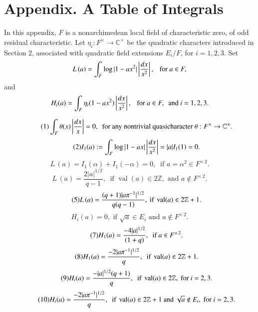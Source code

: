 \documentclass{amsart}
\newcommand\C{{\mathbb C}}
\newcommand\leftd[1]{\left | {d#1\over #1^2}\right |}
\newcommand\leftdx{\leftd x}
\newcommand\LOG{{L\,}}
\newcommand\val{\operatorname{val}}
\begin{document}
\section{Appendix. A Table of Integrals}


In this appendix, $F$ is a nonarchimedean 
local field of characteristic zero,
of odd residual characteristic.  Let $\eta_i:F^\times\to \C^\times$
be the quadratic characters introduced in Section 2, associated with
quadratic field extensions $E_i/F$, for $i=1,2,3$.
Set
$$\LOG(a) = \int_F \log|1-a x^2| \leftdx,\ \ \text{ for } a\in F,$$
and
$$H_i(a) = \int_F \eta_i(1-a x^2) \leftdx,\ \ \text{ for } a\in F,
\text{ \ and } i=1,2,3.$$

\bigskip


\begin{equation}\tag{1}
\int_F\theta(x)\left|{dx\over x}\right| = 0, \ 
\text{\  for any nontrivial quasicharacter\  }
 \theta: F^\times\to \C^\times. 
\end{equation}
%
\begin{equation}\tag{2}
I_1(a):= \int_F \log|1-a x| \leftdx = |a|I_1(1) = 0.
\end{equation}
%
\begin{equation}\tag{3}
\LOG(a) = I_1(\alpha) + I_1(-\alpha) =0,\ \text{ if } a=\alpha^2\in F^{\times\,2}.
\end{equation}
%
\begin{equation}\tag{4}
\LOG(a) = \frac{2|a|^{1/2}} {q-1}, \ \text{ if } \val(a) \in 2{\mathbb Z},
		\text{ and } a\not\in F^{\times\,2}.
\end{equation}
%
%
\begin{equation}\tag{5}
\LOG(a) = {(q+1)|a\pi^{-1}|^{1/2}\over q(q-1)}, \text{ if }
		\val(a) \in 2{\mathbb Z}+1.
\end{equation}
%
%
\begin{equation}\tag{6}
H_i(a) = 0, \text{ if } \sqrt{a} \in E_i \text{ and } a\not\in 
		F^{\times\,2}.
\end{equation}
%
%
\begin{equation}\tag{7}
H_1(a) = {-4|a|^{1/2}\over (1+q)}, \ \text{ if } a\in F^{\times\,2}.
\end{equation}
%
%
%
\begin{equation}\tag{8}
H_1(a) = {-2|a\pi^{-1}|^{1/2}\over q},\ \text{ if }
		\val(a)\in 2{\mathbb Z} + 1.
\end{equation}
%
%
\begin{equation}\tag{9}
H_i(a) = {-|a|^{1/2}(q+1)\over q},\ \text{ if }
		\val(a)\in 2{\mathbb Z}, \text{ for } i=2,3.
\end{equation}
%
%
\begin{equation}\tag{10}
H_i(a) = {-2|a\pi^{-1}|^{1/2}\over q},\ \text{ if }
		\val(a)\in 2{\mathbb Z}+1 \text{ and }
		\sqrt{a}\not\in E_i, \text{ for } i=2,3.
\end{equation}
\end{document}
